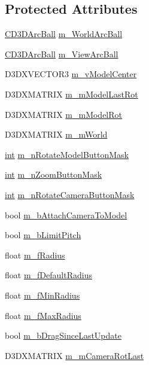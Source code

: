 \subsection*{Protected Attributes}
\begin{DoxyCompactItemize}
\item 
\hyperlink{class_c_d3_d_arc_ball}{CD3DArcBall} \hyperlink{class_c_model_viewer_camera_a0afd3536bbea8ac01986f9e08af5e0bf}{m\_\-WorldArcBall}
\item 
\hyperlink{class_c_d3_d_arc_ball}{CD3DArcBall} \hyperlink{class_c_model_viewer_camera_a43d5ee29ecdd8f85f55cb0e1b7f5ec13}{m\_\-ViewArcBall}
\item 
D3DXVECTOR3 \hyperlink{class_c_model_viewer_camera_ace6a5534406f4dcb72515a15e1e1b4e3}{m\_\-vModelCenter}
\item 
D3DXMATRIX \hyperlink{class_c_model_viewer_camera_a753d010271571ac3d87acb1d062091b2}{m\_\-mModelLastRot}
\item 
D3DXMATRIX \hyperlink{class_c_model_viewer_camera_ae866118acbd31c4c57ee96a408567097}{m\_\-mModelRot}
\item 
D3DXMATRIX \hyperlink{class_c_model_viewer_camera_a047ed680fbcbebef4d83f56e2f414078}{m\_\-mWorld}
\item 
\hyperlink{_d_x_u_tgui_8cpp_a2d77ed03302b6978834ee3b6f57837fb}{int} \hyperlink{class_c_model_viewer_camera_aafcc769eecc0ceda551ee2d7a22e737c}{m\_\-nRotateModelButtonMask}
\item 
\hyperlink{_d_x_u_tgui_8cpp_a2d77ed03302b6978834ee3b6f57837fb}{int} \hyperlink{class_c_model_viewer_camera_ae3bcc79eeae8fa5e20a0369df120f1de}{m\_\-nZoomButtonMask}
\item 
\hyperlink{_d_x_u_tgui_8cpp_a2d77ed03302b6978834ee3b6f57837fb}{int} \hyperlink{class_c_model_viewer_camera_a4bc7721e96a2d3380c5612c67f02101e}{m\_\-nRotateCameraButtonMask}
\item 
bool \hyperlink{class_c_model_viewer_camera_ac56eaab097df2ea4538f34fe1c9d7d49}{m\_\-bAttachCameraToModel}
\item 
bool \hyperlink{class_c_model_viewer_camera_aa33a42faf6ef232889e94c30246043a0}{m\_\-bLimitPitch}
\item 
float \hyperlink{class_c_model_viewer_camera_a5a8802fe2b98550e3f3ecfee32fc1f8e}{m\_\-fRadius}
\item 
float \hyperlink{class_c_model_viewer_camera_a122bcab6c9a503056de43140a730e511}{m\_\-fDefaultRadius}
\item 
float \hyperlink{class_c_model_viewer_camera_a7e9a0f1881fc1b7b3c31db3270d54e06}{m\_\-fMinRadius}
\item 
float \hyperlink{class_c_model_viewer_camera_a9f414b154917b367fc6cc766fd2d7691}{m\_\-fMaxRadius}
\item 
bool \hyperlink{class_c_model_viewer_camera_a6b6d1199533d68ab4168d9d6a306a9bb}{m\_\-bDragSinceLastUpdate}
\item 
D3DXMATRIX \hyperlink{class_c_model_viewer_camera_a4beb0065dc8aca02d996b009caf82739}{m\_\-mCameraRotLast}
\end{DoxyCompactItemize}


